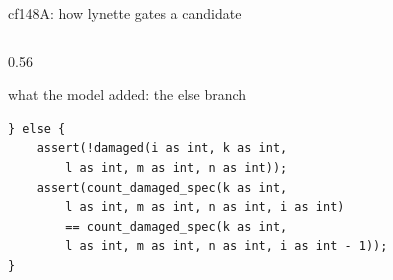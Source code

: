 \documentclass[aspectratio=169,10pt]{beamer}
\begin{document}
\begin{frame}[fragile]{cf148A: how lynette gates a candidate}
\begin{columns}[T]
\begin{column}{0.56\textwidth}
\begin{codebox}[lgGrey]{what the model added: the else branch}
\begin{lstlisting}[basicstyle=\ttfamily\tiny\color{lgInk}]
} else {
    assert(!damaged(i as int, k as int,
        l as int, m as int, n as int));
    assert(count_damaged_spec(k as int,
        l as int, m as int, n as int, i as int)
        == count_damaged_spec(k as int,
        l as int, m as int, n as int, i as int - 1));
}
\end{lstlisting}
\end{codebox}
\end{column}
\end{columns}

\end{frame}
\end{document}
